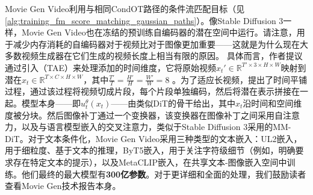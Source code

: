 Movie Gen Video利用与相同CondOT路径的条件流匹配目标（见\cref{alg:training_fm_score_matching_gaussian_paths}）。像Stable Diffusion 3一样，Movie Gen Video也在冻结的预训练自编码器的潜在空间中运行。请注意，用于减少内存消耗的自编码器对于视频比对于图像更加重要——这就是为什么现在大多数视频生成器在它们生成的视频长度上相当有限的原因。
具体而言，作者提议通过引入（TAE）来处理添加的时间维度，它将原始视频$x_t' \in \mathbb{R}^{T' \times 3 \times H \times W}$映射到潜在$x_t\in\mathbb{R}^{T \times C \times H \times W}$，其中$\tfrac{T'}{T} = \tfrac{H'}{H} = \tfrac{W'}{W} = 8$ \cite{moviegen}。为了适应长视频，提出了时间平铺过程，通过该过程将视频切成片段，每个片段单独编码，然后将潜在表示拼接在一起\cite{moviegen}。模型本身——即$u_t^\theta(x_t)$——由类似DiT的骨干给出，其中$x_t$沿时间和空间维度被分块。然后图像补丁通过一个变换器，该变换器在图像补丁之间采用自注意力，以及与语言模型嵌入的交叉注意力，类似于Stable Diffusion 3采用的MM-DiT。对于文本条件化，Movie Gen Video采用三种类型的文本嵌入：UL2嵌入，用于细粒度、基于文本的推理\cite{ul2}，ByT5嵌入，用于关注字符级细节（例如，明确要求存在特定文本的提示）\cite{byte5}，以及MetaCLIP嵌入，在共享文本-图像嵌入空间中训练\cite{metaclip, moviegen}。他们最终的最大模型有\textbf{300亿参数}。对于更详细和全面的处理，我们鼓励读者查看Movie Gen技术报告本身\citep{moviegen}。


